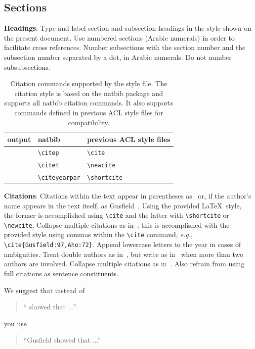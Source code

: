 \documentclass{article}
\begin{document}
\subsection{Sections}

{\bf Headings}: Type and label section and subsection headings in the
style shown on the present document.  Use numbered sections (Arabic
numerals) in order to facilitate cross references. Number subsections
with the section number and the subsection number separated by a dot,
in Arabic numerals.
Do not number subsubsections.

\begin{table}[t!]
\centering
\begin{tabular}{lll}
  output & natbib & previous ACL style files\\
  \hline
  \citep{Gusfield:97} & \verb|\citep| & \verb|\cite| \\
  \citet{Gusfield:97} & \verb|\citet| & \verb|\newcite| \\
  \citeyearpar{Gusfield:97} & \verb|\citeyearpar| & \verb|\shortcite| \\
\end{tabular}
\caption{Citation commands supported by the style file.
  The citation style is based on the natbib package and
  supports all natbib citation commands.
  It also supports commands defined in previous ACL style files
  for compatibility.
  }
\end{table}

{\bf Citations}: Citations within the text appear in parentheses
as~\cite{Gusfield:97} or, if the author's name appears in the text
itself, as Gusfield~.
Using the provided \LaTeX\ style, the former is accomplished using
{\small\verb|\cite|} and the latter with {\small\verb|\shortcite|} or {\small\verb|\newcite|}. Collapse multiple citations as in~\cite{Gusfield:97,Aho:72}; this is accomplished with the provided style using commas within the {\small\verb|\cite|} command, {\em e.g.}, {\small\verb|\cite{Gusfield:97,Aho:72}|}. Append lowercase letters to the year in cases of ambiguities.  
 Treat double authors as
in~\cite{Aho:72}, but write as in~\cite{Chandra:81} when more than two
authors are involved. Collapse multiple citations as
in~\cite{Gusfield:97,Aho:72}. Also refrain from using full citations
as sentence constituents.

We suggest that instead of
\begin{quote}
  ``\cite{Gusfield:97} showed that ...''
\end{quote}
you use
\begin{quote}
``Gusfield    showed that ...''
\end{quote}
\end{document}
